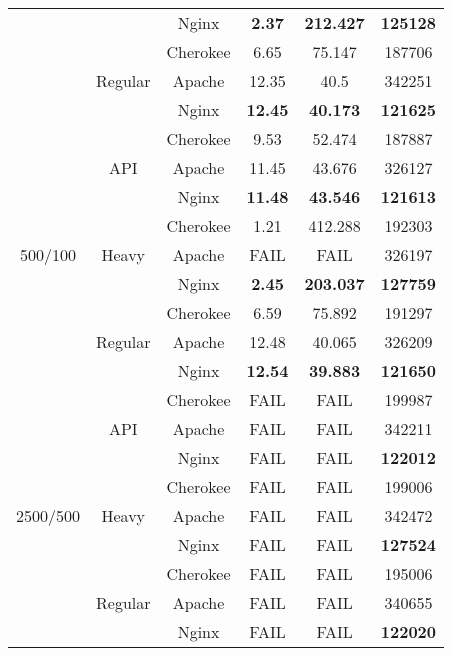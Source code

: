 \begin{center}
\begin{longtable}{c|c|c|c|c|c}
     &  & Nginx & \textbf{2.37} & \textbf{212.427} & \textbf{125128}\\\cline{2-6}
     & \multirow{3}{*}{Regular} & Cherokee & 6.65 & 75.147 & 187706\\\cline{3-6}
     &  & Apache & 12.35 & 40.5 & 342251\\\cline{3-6}
     &  & Nginx & \textbf{12.45} & \textbf{40.173} & \textbf{121625}\\\hline
    \multirow{9}{*}{500/100} & \multirow{3}{*}{API} & Cherokee & 9.53 & 52.474 & 187887\\\cline{3-6}
     &  & Apache & 11.45 & 43.676 & 326127\\\cline{3-6}
     &  & Nginx & \textbf{11.48} & \textbf{43.546} & \textbf{121613}\\\cline{2-6}
     & \multirow{3}{*}{Heavy} & Cherokee & 1.21 & 412.288 & 192303\\\cline{3-6}
     &  & Apache & FAIL & FAIL & 326197\\\cline{3-6}
     &  & Nginx & \textbf{2.45} & \textbf{203.037} & \textbf{127759}\\\cline{2-6}
     & \multirow{3}{*}{Regular} & Cherokee & 6.59 & 75.892 & 191297\\\cline{3-6}
     &  & Apache & 12.48 & 40.065 & 326209\\\cline{3-6}
     &  & Nginx & \textbf{12.54} & \textbf{39.883} & \textbf{121650}\\\hline
    \multirow{9}{*}{2500/500} & \multirow{3}{*}{API} & Cherokee & FAIL & FAIL & 199987\\\cline{3-6}
     &  & Apache & FAIL & FAIL & 342211\\\cline{3-6}
     &  & Nginx & FAIL & FAIL & \textbf{122012}\\\cline{2-6}
     & \multirow{3}{*}{Heavy} & Cherokee & FAIL & FAIL & 199006\\\cline{3-6}
     &  & Apache & FAIL & FAIL & 342472\\\cline{3-6}
     &  & Nginx & FAIL & FAIL & \textbf{127524}\\\cline{2-6}
     & \multirow{3}{*}{Regular} & Cherokee & FAIL & FAIL & 195006\\\cline{3-6}
     &  & Apache & FAIL & FAIL & 340655\\\cline{3-6}
     &  & Nginx & FAIL & FAIL & \textbf{122020}\\
\end{longtable}
\end{center}

